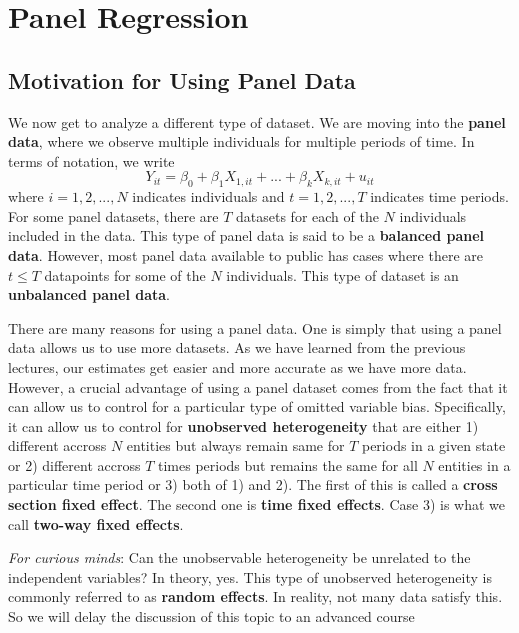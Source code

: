 
\chapter{Panel Regression}
\section{Motivation for Using Panel Data}
We now get to analyze a different type of dataset. We are moving into the \textbf{panel data}, where we observe multiple individuals for multiple periods of time. In terms of notation, we write
\[
Y_{it} = \beta_0 + \beta_1X_{1,it}+ ... +\beta_kX_{k,it}+u_{it}
\]
where $i=1,2,...,N$ indicates individuals and $t=1,2,...,T$ indicates time periods. For some panel datasets, there are $T$ datasets for each of the $N$ individuals included in the data. This type of panel data is said to be a \textbf{balanced panel data}. However, most panel data available to public has cases where there are $t\leq T$ datapoints for some of the $N$ individuals. This type of dataset is an \textbf{unbalanced panel data}. \par\medskip
There are many reasons for using a panel data. One is simply that using a panel data allows us to use more datasets. As we have learned from the previous lectures, our estimates get easier and more accurate as we have more data. However, a crucial advantage of using a panel dataset comes from the fact that it can allow us to control for a particular type of omitted variable bias. Specifically, it can allow us to control for \textbf{unobserved heterogeneity} that are either 1) different accross $N$ entities but always remain same for $T$ periods in a given state or 2) different accross $T$ times periods but remains the same for all $N$ entities in a particular time period or 3) both of 1) and 2). The first of this is called a \textbf{cross section fixed effect}. The second one is \textbf{time fixed effects}. Case 3) is what we call \textbf{two-way fixed effects}.\par\medskip
\begin{mdframed}[backgroundcolor =blue!10]
\textit{For curious minds}: Can the unobservable heterogeneity be unrelated to the independent variables? In theory, yes. This type of unobserved heterogeneity is commonly referred to as \textbf{random effects}. In reality, not many data satisfy this. So we will delay the discussion of this topic to an advanced course 
\end{mdframed} \par\medskip
